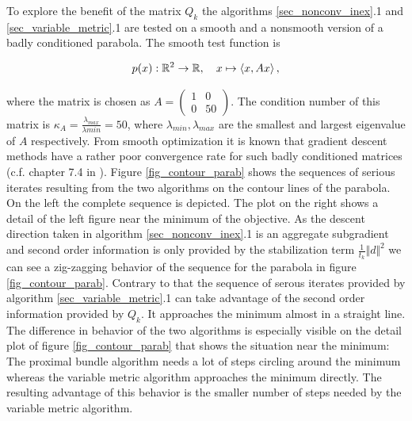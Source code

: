 
To explore the benefit of the matrix \(Q_k\) the algorithms \ref{sec_nonconv_inex}.1 and \ref{sec_variable_metric}.1 are tested on a smooth and a nonsmooth version of a badly conditioned parabola.
The smooth test function is

\[p(x): \mathbb{R}^2 \to \mathbb{R}, \quad x \mapsto \left\langle x, Ax \right\rangle,\]

where the matrix is chosen as \(A = \begin{pmatrix} 1&0 \\ 0&50\end{pmatrix}\). The condition number of this matrix is \(\kappa_A = \frac{\lambda_{max}}{\lambda{min}} = 50\), where \(\lambda_{min}, \lambda_{max}\) are the smallest and largest eigenvalue of \(A\) respectively. From smooth optimization it is known that gradient descent methods have a rather poor convergence rate for such badly conditioned matrices (c.f. chapter 7.4 in \cite{Ulbrich2012}).
Figure \ref{fig_contour_parab} shows the sequences of serious iterates resulting from the two algorithms on the contour lines of the parabola. On the left the complete sequence is depicted. The plot on the right shows a detail of the left figure near the minimum of the objective.
As the descent direction taken in algorithm \ref{sec_nonconv_inex}.1 is an aggregate subgradient and second order information is only provided by the stabilization term \(\frac{1}{t_k}\Vert d\Vert^2\) we can see a zig-zagging behavior of the sequence for the parabola in figure \ref{fig_contour_parab}.
Contrary to that the sequence of serous iterates provided by algorithm \ref{sec_variable_metric}.1 can take advantage of the second order information provided by \(Q_k\).
It approaches the minimum almost in a straight line. The difference in behavior of the two algorithms is especially visible on the detail plot of figure \ref{fig_contour_parab} that shows the situation near the minimum: The proximal bundle algorithm needs a lot of steps circling around the minimum whereas the variable metric algorithm approaches the minimum directly. The resulting advantage of this behavior is the smaller number of steps needed by the variable metric algorithm. 



